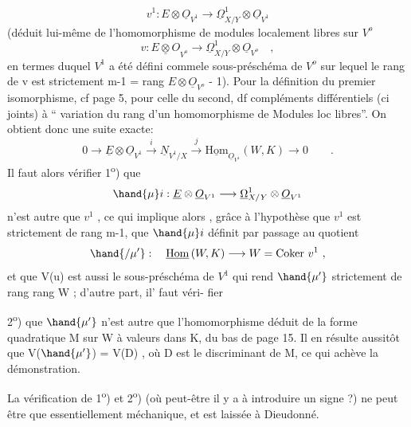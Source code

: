 
\[ v^1 : E\otimes\underline{O}_{V^1} \longrightarrow \underline{\Omega}^1_{X/Y}\otimes\underline{O}_{V^1} \]
 (déduit  lui-même de l'homomorphisme de modules
localement libres sur $V^o$
\[ v : \underline{E\otimes O}_{V^o} \longrightarrow \underline{\Omega}^1_{X/Y}\otimes \underline{O}_{V^o} \quad , \]
en termes duquel  $V^1$ a été défini commele sous-préschéma de $V^o$ sur lequel
le rang de v est strictement \hand{\unsure{$\leq$}} m-1 = rang $E\otimes\underline{O}_{V^o}$ - 1). Pour la définition
du premier isomorphisme, cf page 5, pour celle du second, df compléments
différentiels (ci joints) à `` variation du rang d'un homomorphisme de
Modules loc libres''. On obtient donc une suite exacte:
\[ 0 \to \underline{E}\otimes\underline{O}_{V^1} \xrightarrow{\ i\ } \underline{N}_{V^1/X} \xrightarrow{\ \ j\ \ } \underline{\mathrm{Hom}}_{\underline{O}_{V^1}}(W,K) \longrightarrow 0 \qquad . \]
Il faut alors vérifier 
1\textsuperscript{o}) que
\[ \hand{\mu}i : \underline{E}\otimes\underline{O}_{V^1} \longrightarrow \underline{\Omega}^1_{X/Y}\otimes\underline{O}_{V^1} \]
n'est autre que $v^1$ , ce qui implique alors , grâce à l'hypothèse que
$v^1$ est strictement de rang m-1, que  $\hand{\mu}i$ définit par passage au
quotient
\[ \hand{/\mu'} : \quad \underline{\mathrm{Hom}}\,(W,K) \longrightarrow W = \mathrm{Coker}\ v^1 \ , \]
et que V(u) est aussi le sous-préschéma de $V^1$ qui rend $\hand{\mu'}$ strictement
de rang \hand{\unsure{$\leq$}}rang W  ; d'autre part, il'  faut véri-%
fier

2\textsuperscript{o}) que $\hand{\mu'}$ n'est autre que l'homomorphisme déduit de la forme
quadratique  M sur W à valeurs dans K, du bas de page 15. Il en résulte
aussitôt que V($\hand{\mu'}$) = V(D) , où D est le discriminant de M, ce  qui
achève la démonstration.

La vérification de 1\textsuperscript{o}) et 2\textsuperscript{o}) (où peut-être il y a à introduire un
signe ?) ne peut être que essentiellement méchanique, et est laissée à
Dieudonné.

